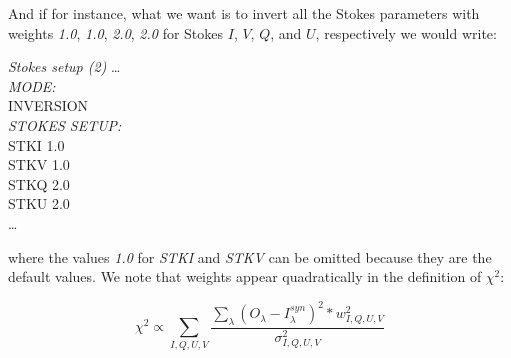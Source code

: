 \begin{itemize}
And if for instance, what we want is to invert all the Stokes parameters with weights {\it 1.0}, {\it 1.0}, {\it 2.0}, {\it 2.0} for Stokes $I$, $V$, $Q$, and $U$, respectively we would write:\\

\begin{ifbox}[label={tb:stokes_setup2}]{{\it Stokes setup (2)}}
  \scriptsize
  \ldots\\
  {\it MODE:}\\
  INVERSION\\
  {\it STOKES SETUP:}\\
  STKI  1.0\\
  STKV  1.0\\
  STKQ  2.0\\
  STKU  2.0\\
  \ldots
  \normalsize
\end{ifbox}

where the values {\it 1.0} for {\it STKI} and {\it STKV} can be omitted because they are the default values. We note that weights appear quadratically in the definition of $\chi^2$:

  \begin{equation}
  \chi^2\propto\sum_{I,Q,U,V}\frac{\sum_{\lambda}(O_{\lambda}-I^{syn}_{\lambda})^2*w_{I,Q,U,V}^2}{\sigma_{I,Q,U,V}^2}
  \end{equation}


\end{itemize}
